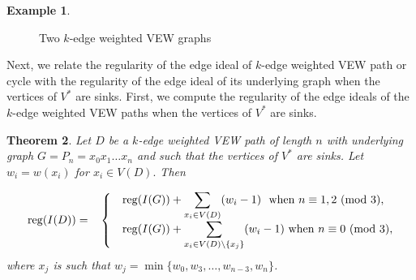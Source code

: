 \documentclass[11pt,reqno]{amsart}
\newcommand{\midarrow}{\tikz \draw[-triangle 90] (0,0) -- +(.1,0);}
\newcommand{\reg}{\operatorname{reg}}
\newtheorem{theorem}{Theorem}[section]
\theoremstyle{definition}
\newtheorem{example}[theorem]{Example}
\begin{document}
\begin{example}
\begin{figure}[!ht]
		\caption{Two  $k$-edge weighted VEW graphs}\label{fig.1} 
\end{figure}
\end{example}





Next, we relate the regularity of the edge ideal of $k$-edge weighted VEW path or cycle with the regularity of the edge ideal of its underlying graph when the vertices of $ V^*$ are sinks. First, we compute the regularity of the edge ideals of the $k$-edge weighted VEW paths when the vertices of $V^*$ are sinks.  


\begin{theorem} \label{ClassII}
	Let $ D $ be a $k$-edge weighted VEW path of length $ n  $  with underlying graph $ G= P_n=x_0 x_1 \ldots x_n $ and such that the vertices of $ V^* $ are sinks. Let $ w_i=w(x_i)  $ for $x_i \in V(D).$ Then       
	
	
	\begin{equation*}
		  \reg(I(D))= \hspace{.3cm}
		\begin{cases}
			&\reg(I(G)) + \displaystyle{  \displaystyle{ \sum_{x_i \in V(D)}}(w_i - 1) } ~\mbox{  when} ~  n\equiv 1,2~(\mbox{mod}~3),\\
			&\reg(I(G)) + \displaystyle{  \displaystyle{ \sum_{x_i \in V(D)\setminus\{x_j\}}}(w_i - 1) } ~\mbox{when}~ n\equiv 0~(\mbox{mod}~3),
		\end{cases}
	\end{equation*}
\hspace*{4cm}	where $x_j$ is such that $w_j = \min\{w_0,w_3,\ldots,w_{n-3},w_{n}\}$.
\end{theorem}
\end{document}
